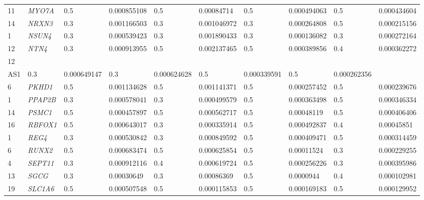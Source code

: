 \begin{refsection}
\begin{otherlanguage}{english}
\begin{scriptsize}
\begin{longtable}{llllllllll}
11 & \cellcolor[HTML]{FE996B}\textit{MYO7A} & 0.5 & 0.000855108 & 0.5 & 0.00084714 & 0.5 & 0.000494063 & 0.5 & 0.000434604 \\
14 & \cellcolor[HTML]{FE996B}\textit{NRXN3} & 0.3 & 0.001166503 & 0.3 & 0.001046972 & 0.3 & 0.000264808 & 0.5 & 0.000215156 \\
1 & \cellcolor[HTML]{FE996B}\textit{NSUN4} & 0.3 & 0.000539423 & 0.3 & 0.001890433 & 0.3 & 0.000136082 & 0.3 & 0.000272164 \\
12 & \cellcolor[HTML]{FE996B}\textit{NTN4} & 0.3 & 0.000913955 & 0.5 & 0.002137465 & 0.5 & 0.000389856 & 0.4 & 0.000362272 \\
12 & \cellcolor[HTML]{FE996B}\textit{\begin{tabular}[c]{@{}c@{}}OVCH1-\\ AS1\end{tabular}} & 0.3 & 0.000649147 & 0.3 & 0.000624628 & 0.5 & 0.000339591 & 0.5 & 0.000262356 \\
6 & \cellcolor[HTML]{FE996B}\textit{PKHD1} & 0.5 & 0.001134628 & 0.5 & 0.001141371 & 0.5 & 0.000257452 & 0.5 & 0.000239676 \\
1 & \cellcolor[HTML]{FE996B}\textit{PPAP2B} & 0.3 & 0.000578041 & 0.3 & \cellcolor[HTML]{FE996B}0.000499579 & 0.5 & 0.000363498 & 0.5 & 0.000346334 \\
14 & \cellcolor[HTML]{FE996B}\textit{PSMC1} & 0.5 & \cellcolor[HTML]{FE996B}0.000457897 & 0.5 & 0.000562717 & 0.5 & 0.00048119 & 0.5 & 0.000406406 \\
16 & \cellcolor[HTML]{FE996B}\textit{RBFOX1} & 0.5 & 0.000643017 & 0.3 & \cellcolor[HTML]{FE996B}0.000335914 & 0.5 & 0.000492837 & 0.4 & 0.00045851 \\
1 & \cellcolor[HTML]{FE996B}\textit{REG4} & 0.3 & 0.000530842 & 0.3 & 0.000849592 & 0.5 & 0.000409471 & 0.5 & 0.000314459 \\
6 & \cellcolor[HTML]{FE996B}\textit{RUNX2} & 0.5 & 0.000683474 & 0.5 & 0.000625854 & 0.5 & 0.00011524 & 0.3 & 0.000229255 \\
4 & \cellcolor[HTML]{FE996B}\textit{SEPT11} & 0.3 & 0.000912116 & 0.4 & 0.000619724 & 0.5 & 0.000256226 & 0.3 & 0.000395986 \\
13 & \cellcolor[HTML]{FE996B}\textit{SGCG} & 0.3 & \cellcolor[HTML]{FE996B}0.00030649 & 0.3 & 0.00086369 & 0.5 & 0.0000944 & 0.4 & 0.000102981 \\
19 & \cellcolor[HTML]{FE996B}\textit{SLC1A6} & 0.5 & 0.000507548 & 0.5 & \cellcolor[HTML]{FE996B}0.000115853 & 0.5 & 0.000169183 & 0.5 & 0.000129952 \\

\end{longtable}
\end{scriptsize}
\end{otherlanguage}
\end{refsection}
